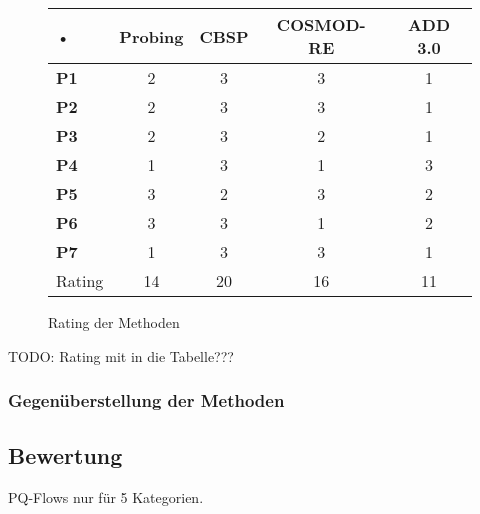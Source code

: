 \begin{figure}[h] %
\caption{Rating der Methoden}
\centering
\begin{tabular}{|l|c|c|c|c|}
\hline 
\rule[-1ex]{0pt}{2.5ex} • & \textbf{Probing} & \textbf{CBSP} & \textbf{COSMOD-RE} & \textbf{ADD 3.0} \\ 
\hline 
\rule[-1ex]{0pt}{2.5ex} \textbf{P1} & 2 & 3 & 3 & 1 \\ 
\hline 
\rule[-1ex]{0pt}{2.5ex} \textbf{P2} & 2 & 3 & 3 & 1 \\ 
\hline 
\rule[-1ex]{0pt}{2.5ex} \textbf{P3} & 2 & 3 & 2 & 1 \\ 
\hline 
\rule[-1ex]{0pt}{2.5ex} \textbf{P4} & 1 & 3 & 1 & 3 \\ 
\hline 
\rule[-1ex]{0pt}{2.5ex} \textbf{P5} & 3 & 2 & 3 & 2 \\ 
\hline 
\rule[-1ex]{0pt}{2.5ex} \textbf{P6} & 3 & 3 & 1 & 2 \\ 
\hline 
\rule[-1ex]{0pt}{2.5ex} \textbf{P7} & 1 & 3 & 3 & 1 \\ 
\hline 
\hline 
\rule[-1ex]{0pt}{2.5ex} Rating & 14 & 20 & 16 & 11 \\ 
\hline 
\end{tabular} 
\label{tab:method_rating}
\end{figure}

TODO: Rating mit in die Tabelle??? \\





\subsubsection{Gegenüberstellung der Methoden}





\subsection{Bewertung}



PQ-Flows nur für 5 Kategorien. \\